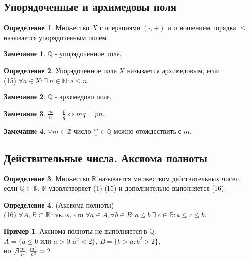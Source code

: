 \documentclass[a4paper, 12pt]{article}
\newcommand{\Z}{\mathbb{Z}}
\newcommand{\N}{\mathbb{N}}
\newcommand{\R}{\mathbb{R}}
\newcommand{\Q}{\mathbb{Q}}
\theoremstyle{definition}
\newtheorem*{definition}{Определение}
\newtheorem*{comm}{Замечание}
\newtheorem*{example}{Пример}
\begin{document}
    \subsection{Упорядоченные и архимедовы поля}    
        \begin{definition}
            Множество $X$ с операциями $(\cdot, +)$ и отношением порядка $\leq$ называется упорядоченным полем.
        \end{definition}
        \begin{comm}
            $\Q$ - упорядоченное поле.
        \end{comm}  
        \begin{definition}
            Упорядоченное поле $X$ называется архимедовым, если\\
            (15) $\forall a\in X: \exists\ n\in \N: a\leq n$.
        \end{definition}
        \begin{comm}
            $\Q$ - архимедово поле.
        \end{comm} 
        \begin{comm}
            $\frac{m}{n}=\frac{p}{q} \Leftrightarrow mq=pn$.
        \end{comm}
        \begin{comm}
            $\forall m\in \Z$ число $\frac{m}{1}\in \Q$ можно отождествить с $m$.
        \end{comm}
    \subsection{Действительные числа. Аксиома полноты}
        \begin{definition}
            Множество $\R$ называется множеством действительных чисел, если $\Q \subset \R$, $\R$ удовлетворяет (1)-(15) и дополнительно выполняется (16).
        \end{definition}
        \begin{definition} (Аксиома полноты)\\
            (16) $\forall A,B\subset \R$ таких, что $\forall a\in A, \forall b\in B: a\leq b \ \exists \ c\in \R: a\leq c\leq b$.
        \end{definition}
        \begin{example}
        Аксиома полноты не выполняется в $\Q$.\\
        $A=\{a\leq 0$ или $a>0: a^2<2\}$, $B=\{b>a: b^2>2\}$,\\
        но $\not\exists \frac{m}{n}, \frac{m^2}{n^2}=2$
        \end{example}
\end{document}
